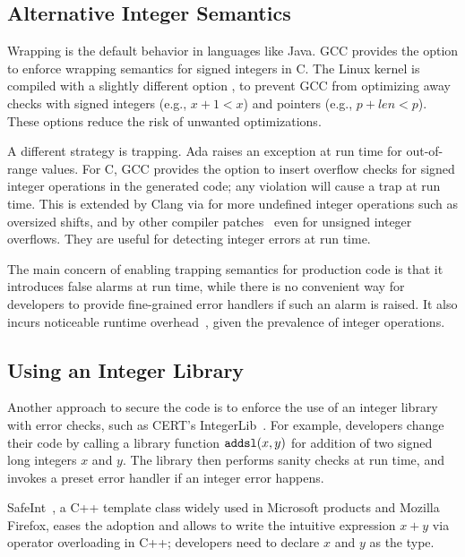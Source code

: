 \subsection{Alternative Integer Semantics}

Wrapping is the default behavior in languages like Java.
GCC provides the option  to enforce wrapping semantics
for signed integers in C.  The Linux kernel is compiled with a
slightly different option , to prevent GCC
from optimizing away checks with signed integers (e.g., $x + 1 <
x$) and pointers (e.g., $p + \mathit{len} < p$).
These options reduce the risk of unwanted optimizations.

A different strategy is trapping.  Ada raises an exception at run
time for out-of-range values.  For C, GCC provides the option
 to insert overflow checks for signed integer operations
in the generated code; any violation will cause a trap at run time.
This is extended by Clang via  for
more undefined integer operations such as oversized shifts, and by
other compiler patches~\cite{brumley:rich, ioc} even for unsigned
integer overflows.  They are useful for detecting integer errors
at run time.

The main concern of enabling trapping semantics for production code
is that it introduces false alarms at run time, while there is no
convenient way for developers to provide fine-grained error handlers
if such an alarm is raised.  It also incurs noticeable runtime
overhead~\cite{ioc}, given the prevalence of integer operations.

\subsection{Using an Integer Library}

Another approach to secure the code is to enforce the use of an integer
library with error checks, such as CERT's
IntegerLib~\cite[INT03-C]{seacord:secure-c}.  For example, developers
change their code by calling a library function $\texttt{addsl}(x, y)$
for addition of two signed long integers $x$ and $y$.  The library
then performs sanity checks at run time, and invokes a preset error
handler if an integer error happens.

SafeInt~\cite{safeint}, a C++ template class widely used in Microsoft
products and Mozilla Firefox, eases the adoption and allows to write
the intuitive expression $x + y$ via operator overloading in C++;
developers need to declare $x$ and $y$ as the 
type.

